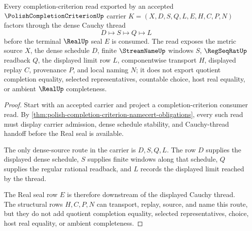 \begin{theorem}
\label{thm:polish-completion-criterion-cauchy-thread-handoff}
Every completion-criterion read exported by an accepted $\PolishCompletionCriterionUp$ carrier $K=(X,D,S,Q,L,E,H,C,P,N)$ factors through the dense Cauchy thread
$$
D\longmapsto S\longmapsto Q\longmapsto L
$$
before the terminal $\RealUp$ seal $E$ is consumed. The read exposes the metric source $X$, the dense schedule $D$, finite $\StreamNameUp$ windows $S$, $\RegSeqRatUp$ readback $Q$, the displayed limit row $L$, componentwise transport $H$, displayed replay $C$, provenance $P$, and local naming $N$; it does not export quotient completion equality, selected representatives, countable choice, host real equality, or ambient $\RealUp$ completeness.
\end{theorem}
\begin{proof}
Start with an accepted carrier and project a completion-criterion consumer read. By \autoref{thm:polish-completion-criterion-namecert-obligations}, every such read must display carrier admission, dense schedule stability, and Cauchy-thread handoff before the Real seal is available.

The only dense-source route in the carrier is $D,S,Q,L$. The row $D$ supplies the displayed dense schedule, $S$ supplies finite windows along that schedule, $Q$ supplies the regular rational readback, and $L$ records the displayed limit reached by the thread.

The Real seal row $E$ is therefore downstream of the displayed Cauchy thread. The structural rows $H,C,P,N$ can transport, replay, source, and name this route, but they do not add quotient completion equality, selected representatives, choice, host real equality, or ambient completeness.
\end{proof}


\begin{closurestatus}{\PolishCompletionCriterionUp}
  \theoryclosure{\seedClosure}
  \formalstatus{\unformalizedV}
\end{closurestatus}
